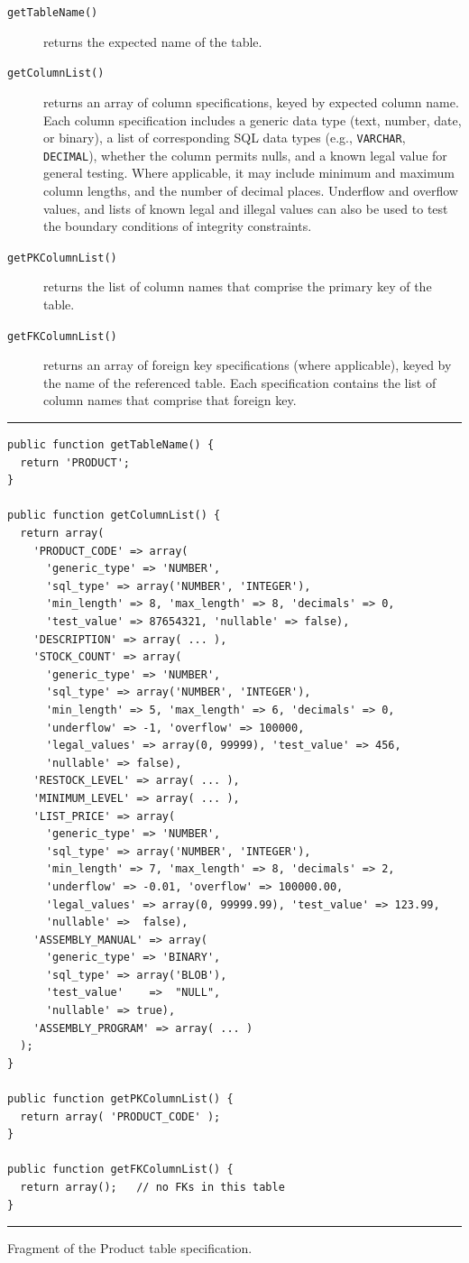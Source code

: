 \documentclass[sigconf, authordraft, capitalise]{acmart}
\begin{document}
\begin{description}
    \item[\texttt{getTableName()}] returns the expected name of the table.
    \item[\texttt{getColumnList()}] returns an array of column specifications, keyed by expected column name. Each column specification includes a generic data type (text, number, date, or binary), a list of corresponding SQL data types (e.g., \texttt{VARCHAR}, \texttt{DECIMAL}), whether the column permits nulls, and a known legal value for general testing. Where applicable, it may include minimum and maximum column lengths, and the number of decimal places. Underflow and overflow values, and lists of known legal and illegal values can also be used to test the boundary conditions of integrity constraints.
    \item[\texttt{getPKColumnList()}] returns the list of column names that comprise the primary key of the table.
    \item[\texttt{getFKColumnList()}] returns an array of foreign key specifications (where applicable), keyed by the name of the referenced table. Each specification contains the list of column names that comprise that foreign key. 
\end{description}


\begin{table}
    \footnotesize
    \hrule
    \begin{verbatim}
public function getTableName() {
  return 'PRODUCT';
}

public function getColumnList() {
  return array(
    'PRODUCT_CODE' => array(
      'generic_type' => 'NUMBER',
      'sql_type' => array('NUMBER', 'INTEGER'),
      'min_length' => 8, 'max_length' => 8, 'decimals' => 0,
      'test_value' => 87654321, 'nullable' => false),
    'DESCRIPTION' => array( ... ),
    'STOCK_COUNT' => array(
      'generic_type' => 'NUMBER',
      'sql_type' => array('NUMBER', 'INTEGER'),
      'min_length' => 5, 'max_length' => 6, 'decimals' => 0,
      'underflow' => -1, 'overflow' => 100000,
      'legal_values' => array(0, 99999), 'test_value' => 456,
      'nullable' => false),
    'RESTOCK_LEVEL' => array( ... ),
    'MINIMUM_LEVEL' => array( ... ),
    'LIST_PRICE' => array(
      'generic_type' => 'NUMBER',
      'sql_type' => array('NUMBER', 'INTEGER'),
      'min_length' => 7, 'max_length' => 8, 'decimals' => 2,
      'underflow' => -0.01, 'overflow' => 100000.00,
      'legal_values' => array(0, 99999.99), 'test_value' => 123.99,
      'nullable' =>  false),
    'ASSEMBLY_MANUAL' => array(
      'generic_type' => 'BINARY',
      'sql_type' => array('BLOB'),
      'test_value'    =>  "NULL",
      'nullable' => true),
    'ASSEMBLY_PROGRAM' => array( ... )
  );
}

public function getPKColumnList() {
  return array( 'PRODUCT_CODE' );
}

public function getFKColumnList() {
  return array();   // no FKs in this table
}   \end{verbatim}
    \vskip2pt\hrule\vskip2pt
    \caption{Fragment of the \textsf{Product} table specification.}
    \label{fig-test-class}
\end{table}
\end{document}
